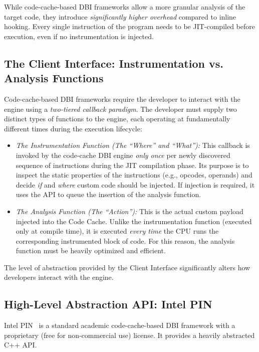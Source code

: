 While code-cache-based \ac{DBI} frameworks allow a more granular analysis of the target code, they introduce \emph{significantly higher overhead} compared to inline hooking.
Every single instruction of the program needs to be \ac{JIT}-compiled before execution, even if no instrumentation is injected.
\subsection{The Client Interface: Instrumentation vs. Analysis Functions}

Code-cache-based \ac{DBI} frameworks require the developer to interact with the engine using a \emph{two-tiered callback paradigm}.
The developer must supply two distinct types of functions to the engine, each operating at fundamentally different times during the execution lifecycle:

\begin{itemize}
	\item \emph{The Instrumentation Function (The ``Where'' and ``What''):} 
	This callback is invoked by the code-cache \ac{DBI} engine \emph{only once} per newly discovered sequence of instructions during the \ac{JIT} compilation phase.
	Its purpose is to inspect the static properties of the instructions (e.g., opcodes, operands) and decide \emph{if} and \emph{where} custom code should be injected.
	If injection is required, it uses the \ac{API} to queue the insertion of the analysis function.
	\item \emph{The Analysis Function (The ``Action''):} 
	This is the actual custom payload injected into the Code Cache.
	Unlike the instrumentation function (executed only at compile time), it is executed \emph{every time} the CPU runs the corresponding instrumented block of code.
	For this reason, the analysis function must be heavily optimized and efficient.
\end{itemize}

The level of abstraction provided by the Client Interface significantly alters how developers interact with the engine.
\subsection{High-Level Abstraction API: Intel PIN}
Intel PIN~\cite{DBLP:conf/pldi/LukCMPKLWRH05} is a standard academic code-cache-based \ac{DBI} framework with a proprietary (free for non-commercial use) license.
It provides a heavily abstracted C++ \ac{API}.

